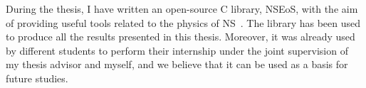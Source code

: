 During the thesis, I have written an open-source C library, NSEoS, with the 
aim of providing useful tools related to the physics of NS~\cite{NSEoS}. The 
library has been used to produce all the results presented in this thesis.
Moreover, it was already used by different students to perform their internship
under the joint supervision of my thesis advisor and myself, and 
we believe that it can be used as a basis for future studies.

